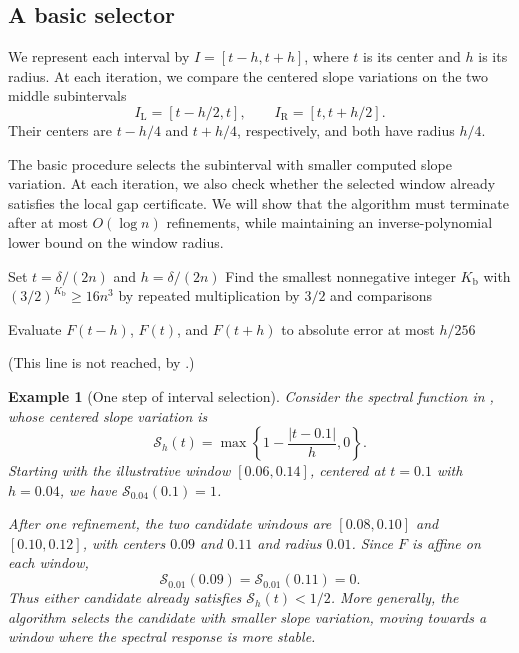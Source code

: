 \documentclass[10pt,a4paper]{article}
\newtheorem{example}{Example}[section]
\begin{document}
\subsection{A basic selector}
\label{subsec:basic-selection}

We represent each interval by $I=[t-h,t+h]$,
where $t$ is its center and $h$ is its radius.
At each iteration, we compare the centered slope
variations on the two middle subintervals
\[
I_{\mathrm L}=[t-h/2,t],
\qquad
I_{\mathrm R}=[t,t+h/2].
\]
Their centers are $t-h/4$ and $t+h/4$, respectively,
and both have radius $h/4$.


The basic procedure selects the subinterval with
smaller computed slope variation. At each iteration,
we also check whether the selected window already
satisfies the local gap certificate. We will show
that the algorithm must terminate after at most
$O(\log n)$ refinements, while maintaining an
inverse-polynomial lower bound on the window radius.


\begin{algorithm}[t]

\caption{Basic selection of a perturbation parameter}
\label{alg:selection-basic}
\DontPrintSemicolon
{}

Set $t=\delta/(2n)$ and $h=\delta/(2n)$\;
Find the smallest nonnegative integer $K_{\mathrm b}$
with $(3/2)^{K_{\mathrm b}}\geq16n^3$ by repeated
multiplication by $3/2$ and comparisons\;

Evaluate $F(t-h)$, $F(t)$, and $F(t+h)$
to absolute error at most $h/256$\;

(This line is not reached, by .)\;
\end{algorithm}

\begin{example}[One step of interval selection]
\label{ex:selection}
Consider the spectral function in ,
whose centered slope variation is
\[
\mathcal S_h(t)
=\max\left\{1-\frac{|t-0.1|}{h},0\right\}.
\]
Starting with the illustrative window
$[0.06,0.14]$, centered at $t=0.1$ with $h=0.04$,
we have $\mathcal S_{0.04}(0.1)=1$.

After one refinement, the two candidate windows
are $[0.08,0.10]$ and $[0.10,0.12]$, with centers
$0.09$ and $0.11$ and radius $0.01$. Since $F$
is affine on each window,
\[
\mathcal S_{0.01}(0.09)
=\mathcal S_{0.01}(0.11)=0.
\]
Thus either candidate already satisfies
$\mathcal S_h(t)<1/2$.
More generally, the algorithm selects the candidate
with smaller slope variation, moving towards a
window where the spectral response is more stable.
\end{example}
\end{document}
